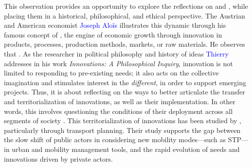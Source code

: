 \begin{refsegment}
This observation provides an opportunity to explore the reflections on  and  \textcolor{blue}{\autocite[]{schumpeter_theorie_1911}}, while placing them in a historical, philosophical, and ethical perspective. The Austrian and American economist \textcolor{blue}{Joseph Aloïs} \textcolor{blue}{\textcite[107]{schumpeter_capitalisme_1942}} illustrates this dynamic through his famous concept of , the engine of economic growth through innovation in products, processes, production methods, markets, or raw materials. He observes that . As the researcher in political philosophy and history of ideas \textcolor{blue}{Thierry} \textcolor{blue}{\textcite{menissier_innovations_2021}} addresses in his work \textsl{Innovations: A Philosophical Inquiry}, innovation is not limited to responding to pre-existing needs; it also acts on the collective imagination and stimulates interest in the \textsl{different}, in order to support emerging projects. Thus, it is about reflecting on the ways to better articulate the transfer and territorialization of innovations, as well as their implementation. In other words, this involves questioning the conditions of their deployment across all segments of society \textcolor{blue}{\autocite[5]{baron_thierry_2022}}. This territorialization of innovations has been studied by \textcolor{blue}{\textcite[13]{castex_prise_2017}}, particularly through transport planning. Their study supports the gap between the slow shift of public actors in considering new mobility modes—such as \acrfull{STP}—in urban and mobility management tools, and the rapid evolution of needs and innovations driven by private actors.%


\end{refsegment}
